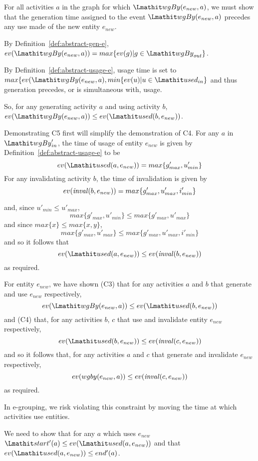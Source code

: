 
For all activities $a$ in the graph for which $\wgby(e_{new},a)$, we must show that the generation time assigned to the event $\wgby(e_{new},a)$ precedes any use made of the new entity $e_{new}$.

By Definition~\ref{def:abstract-gen-e}, $ev(\wgby(e_{new},a)) = max\{ev(g)|g\in \wgby_{out}\}$.

By Definition~\ref{def:abstract-usage-e}, usage time is set to $max\{ev(\wgby(e_{new},a), min \{ ev(u) | u \in \used_{in} \}$ and thus generation precedes, or is simultaneous with, usage.

So, for any generating activity $a$ and using activity $b$,  $ev(\wgby(e_{new},a)) \leq ev(\used(b,e_{new}))$.
 



Demonstrating C5 first will simplify the demonstration of C4. 
%
For any $a$ in $\wgby'_{in}$, the time of usage of entity $e_{new}$ is given by Definition~\ref{def:abstract-usage-e} to be 
\[
ev(\used(a,e_{new})) = max\{g'_{max},u'_{min}\}
\]
For any invalidating activity $b$, the time of invalidation is given by
\[
ev(\mathit{inval}(b,e_{new})) = max\{g'_{max},u'_{max},i'_{min}\}
\]


and, since $u'_{min} \leq u'_{max}$, 
\[
max\{g'_{max},u'_{min}\} \leq max\{g'_{max},u'_{max}\}
\]
and since $max\{x\} \leq max\{x,y\}$, 
\[
max\{g'_{max},u'_{max}\} \leq max\{g'_{max},u'_{max},i'_{min}\} 
\]
and so it follows that 
\[
 ev(\used(a,e_{new})) \leq ev(\inv(b,e_{new})) 
\]
as required.


For entity $e_{new}$, we have shown (C3) that for any activities $a$ and $b$ that generate and use $e_{new}$ respectively, 
\[
ev(\wgby(e_{new},a)) \leq ev(\used(b,e_{new}))
\]
and (C4) that, for any activities $b$, $c$ that use and invalidate entity $e_{new}$ respectively,  
\[
ev(\used(b,e_{new})) \leq ev(\inv(c,e_{new}))
\]
and so it follows that, for any activities $a$ and $c$ that generate and invalidate $e_{new}$ respectively,  
\[
ev(wgby(e_{new},a)) \leq ev(\mathit{inval}(c,e_{new}))
\]
as required. 

  In e-grouping, we risk violating this constraint by moving the time at which activities use entities.

We need to show that for any $a$ which uses $e_{new}$ $\start'(a) \leq ev(\used(a,e_{new}))$ and that $ev(\used(a,e_{new}))  \leq end'(a)$.

